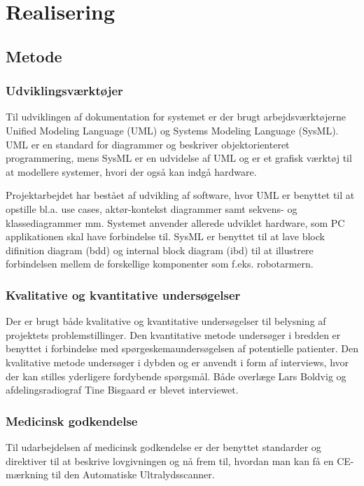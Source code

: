 \chapter{Realisering}\label{kapitel_Realisering}

\section{Metode}
\subsection{Udviklingsværktøjer} 
Til udviklingen af dokumentation for systemet er der brugt arbejdsværktøjerne Unified Modeling Language (UML) og Systems Modeling Language (SysML). UML er en standard for diagrammer og beskriver objektorienteret programmering, mens SysML er en udvidelse af UML og er et grafisk værktøj til at modellere systemer, hvori der også kan indgå hardware. 

Projektarbejdet har bestået af udvikling af software, hvor  UML er benyttet til at opstille bl.a. use cases, aktør-kontekst diagrammer samt sekvens- og klassediagrammer mm. Systemet anvender allerede udviklet hardware, som PC applikationen skal have forbindelse til. SysML er benyttet til at lave block difinition diagram (bdd) og internal block diagram (ibd) til at illustrere forbindelsen mellem de forskellige komponenter som f.eks. robotarmern.

\subsection{Kvalitative og kvantitative undersøgelser}
Der er brugt både kvalitative og kvantitative undersøgelser til belysning af projektets problemstillinger. Den kvantitative metode undersøger i bredden er benyttet i forbindelse med spørgeskemaundersøgelsen af potentielle patienter. Den kvalitative metode undersøger i dybden og er anvendt i form af interviews, hvor der kan stilles yderligere fordybende spørgsmål. Både overlæge Lars Boldvig og afdelingsradiograf Tine Bisgaard er blevet interviewet. 

\subsection{Medicinsk godkendelse}
Til udarbejdelsen af medicinsk godkendelse er der benyttet standarder og direktiver til at beskrive lovgivningen og nå frem til, hvordan man kan få en CE-mærkning til den Automatiske Ultralydsscanner. 

